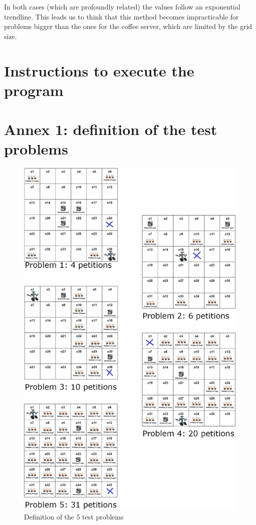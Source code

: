\documentclass[12pt,a4paper,oneside]{article}
\numberwithin{equation}{section}
\numberwithin{equation}{section}
\theoremstyle{definition}
\begin{document}
In both cases (which are profoundly related) the values follow an exponential trendline. This leads us to think that this method becomes impracticable for problems bigger than the ones for the coffee server, which are limited by the grid size.

\section{Instructions to execute the program}

\newpage
\section{Annex 1: definition of the test problems}
\begin{figure}[!h]
	\centering
	\includegraphics[scale=0.4]{figures/problems.png}
	\caption{Definition of the 5 test problems}
	\label{problems} 
\end{figure}
\end{document}
